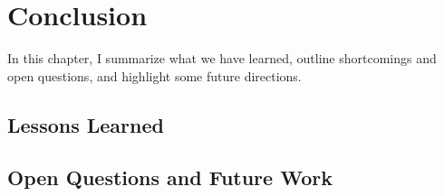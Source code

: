 \chapter{Conclusion}
\label{chap:conclusion}

In this chapter, I summarize what we have learned, outline shortcomings and open questions, and highlight some future directions.

\section{Lessons Learned}

\section{Open Questions and Future Work}